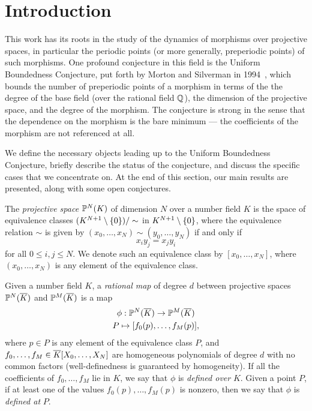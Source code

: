 \section{Introduction}
\label{sec:bg}

This work has its roots in the study of the dynamics of morphisms over
projective spaces, in particular the periodic points (or more
generally, preperiodic points) of such morphisms. One profound
conjecture in this field is the Uniform Boundedness Conjecture, put
forth by Morton and Silverman in 1994~\cite{MR1264933}, which bounds
the number of preperiodic points of a morphism in terms of the the
degree of the base field (over the rational field $\Q$), the dimension
of the projective space, and the degree of the morphism. The
conjecture is strong in the sense that the dependence on the morphism
is the bare minimum --- the coefficients of the morphism are not
referenced at all.

We define the necessary objects leading up to the Uniform Boundedness
Conjecture, briefly describe the status of the conjecture, and discuss
the specific cases that we concentrate on. At the end of this section,
our main results are presented, along with some open conjectures.

\begin{definition}
  The \emph{projective space} $\P^N(K)$ of dimension $N$ over a number
  field $K$ is the space of equivalence classes $(K^{N+1} \setminus
  \set{0})/\sim$ in $K^{N+1} \setminus \set{0}$, where the equivalence
  relation $\sim$ is given by $(x_0, \dots, x_N) \sim (y_0, \dots,
  y_N)$ if and only if
  \[
  x_i y_j = x_j y_i
  \]
  for all $0 \le i, j \le N$. We denote such an equivalence class by
  $[x_0, \dots, x_N]$, where $(x_0, \dots, x_N)$ is any element of the
  equivalence class.
\end{definition}

\begin{definition}
  Given a number field $K$, a \emph{rational map} of degree $d$
  between projective spaces $\P^N(\ol{K})$ and $\P^M(\ol{K})$ is a
  map
  \[
  \begin{gathered}
    \phi: \P^N(\ol{K}) \to \P^M(\ol{K})\\
    P \mapsto [f_0(p), \dots, f_M(p)],
  \end{gathered}
  \]
  where $p \in P$ is any element of the equivalence class $P$, and
  $f_0, \dots, f_M \in \ol{K}[X_0, \dots, X_N]$ are homogeneous
  polynomials of degree $d$ with no common factors (well-definedness
  is guaranteed by homogeneity). If all the coefficients of $f_0,
  \dots, f_M$ lie in $K$, we say that $\phi$ is \emph{defined over}
  $K$. Given a point $P$, if at least one of the values $f_0(p),
  \dots, f_M(p)$ is nonzero, then we say that $\phi$ is \emph{defined
    at} $P$.
\end{definition}

